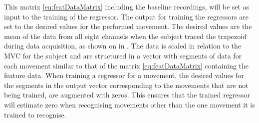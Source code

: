 
This matrix \eqref{eq:featDataMatrix} including the baseline recordings, will be set as input to the training of the regressor. The output for training the regressors are set to the desired values for the performed movement. The desired values are the mean of the data from all eight channels when the subject traced the trapezoid during data acquisition, as shown on  in . The data is scaled in relation to the MVC for the subject and are structured in a vector with segments of data for each movement similar to that of the matrix \eqref{eq:featDataMatrix} containing the feature data. When training a regressor for a movement, the desired values for the segments in the output vector corresponding to the movements that are not being trained, are augmented with zeros. This ensures that the trained regressor will estimate zero when recognising movements other than the one movement it is trained to recognise. 

